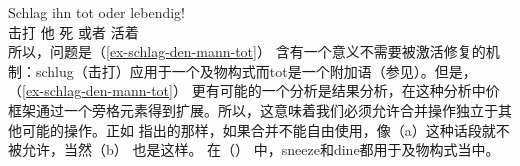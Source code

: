 \ea
\gll Schlag ihn tot oder lebendig!\\
     击打   他 死 或者 活着\\
\z
所以，问题是（\ref{ex-schlag-den-mann-tot}） 含有一个意义不需要被激活修复的机制：schlug（击打）应用于一个及物构式而tot是一个附加语（参见\citealp{Winkler97a}）。但是， （\ref{ex-schlag-den-mann-tot}） 更有可能的一个分析是结果分析，在这种分析中价框架通过一个旁格元素得到扩展。所以，这意味着我们必须允许合并操作独立于其他可能的操作。正如 \citet[]{SvT2011a}指出的那样，如果合并不能自由使用，像（a）这种话段就不被允许，当然（b） 也是这样。
\eal
{}
\zl
在（） 中，sneeze和dine都用于及物构式当中。

